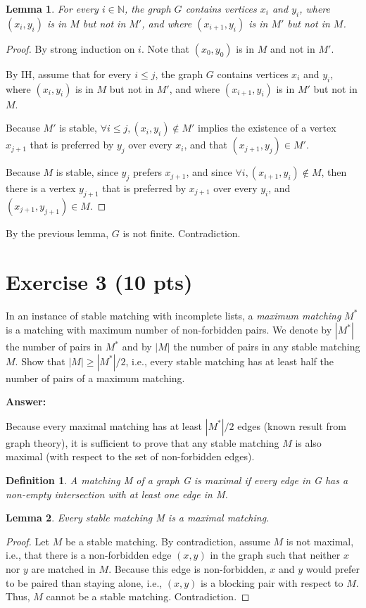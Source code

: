 \documentclass{article}
\newtheorem{mylemma}{\textbf{Lemma}}
\newtheorem{mydefinition}{Definition}
\begin{document}
\begin{mylemma}
For every $i \in \mathbb{N}$, the graph $G$ contains vertices $x_i$ and $y_i$, where $(x_i, y_i)$ is in $M$ but not in $M'$, and where $(x_{i+1}, y_i)$ is in $M'$ but not in $M$.
\end{mylemma}
\begin{proof}
By strong induction on $i$. Note that $(x_0, y_0)$ is in $M$ and not in $M'$.

By IH, assume that for every $i \le j$, the graph $G$ contains vertices $x_i$ and $y_i$, where $(x_i, y_i)$ is in $M$ but not in $M'$, and where $(x_{i+1}, y_i)$ is in $M'$ but not in $M$.

Because $M'$ is stable, $\forall i \le j, (x_i, y_i) \notin M'$ implies the existence of a vertex $x_{j+1}$ that is preferred by $y_j$ over every $x_i$, and that $(x_{j+1}, y_j) \in M'$.

Because $M$ is stable, since $y_j$ prefers $x_{j+1}$, and since $\forall i, (x_{i+1}, y_i) \notin M$, then there is a vertex $y_{j+1}$ that is preferred by $x_{j+1}$ over every $y_i$, and ${(x_{j+1}, y_{j+1}) \in M}$.
\end{proof}

\noindent By the previous lemma, $G$ is not finite. Contradiction.

\section{Exercise 3 (10 pts)}

In an instance of stable matching with incomplete lists, a \emph{maximum matching} $M^*$ is a matching with maximum number of non-forbidden pairs. We denote by $|M^*|$ the number of pairs in $M^*$ and by $|M|$ the number of pairs in any stable matching $M$. Show that $|M| \ge |M^*|/2$, i.e., every stable matching has at least half the number of pairs of a maximum matching.

\bigskip \noindent \textbf{Answer:}

Because every maximal matching has at least $|M^*|/2$ edges (known result from graph theory), it is sufficient to prove
that any stable matching $M$ is also maximal (with respect to the set of non-forbidden edges).

\begin{mydefinition}
A matching M of a graph G is maximal if every edge in G has a non-empty intersection with at least one edge in M.
\end{mydefinition}

\begin{mylemma}
Every stable matching M is a maximal matching.
\end{mylemma}
\begin{proof}
Let $M$ be a stable matching. By contradiction, assume $M$ is not maximal, i.e., that there is a non-forbidden edge $(x,y)$ in the graph such that neither $x$ nor $y$ are matched in $M$. Because this edge is non-forbidden, $x$ and $y$ would prefer to be paired than staying alone, i.e., $(x,y)$ is a blocking pair with respect to $M$. Thus, $M$ cannot be a stable matching. Contradiction.
\end{proof}
\end{document}
